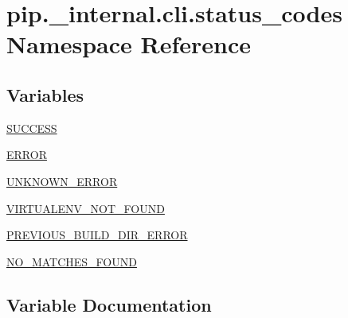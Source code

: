 \hypertarget{namespacepip_1_1__internal_1_1cli_1_1status__codes}{}\section{pip.\+\_\+internal.\+cli.\+status\+\_\+codes Namespace Reference}
\label{namespacepip_1_1__internal_1_1cli_1_1status__codes}
\subsection*{Variables}
\begin{DoxyCompactItemize}
\item 
\hyperlink{namespacepip_1_1__internal_1_1cli_1_1status__codes_a600893ce9f014138ba353274d9a6b47a}{S\+U\+C\+C\+E\+SS}
\item 
\hyperlink{namespacepip_1_1__internal_1_1cli_1_1status__codes_a2ebd7a21970dfe77aab693187bba32a4}{E\+R\+R\+OR}
\item 
\hyperlink{namespacepip_1_1__internal_1_1cli_1_1status__codes_a9f95e798d32dc470f7abd2d98fcde1d7}{U\+N\+K\+N\+O\+W\+N\+\_\+\+E\+R\+R\+OR}
\item 
\hyperlink{namespacepip_1_1__internal_1_1cli_1_1status__codes_afffef3dca49f6f3361ba824dddc30697}{V\+I\+R\+T\+U\+A\+L\+E\+N\+V\+\_\+\+N\+O\+T\+\_\+\+F\+O\+U\+ND}
\item 
\hyperlink{namespacepip_1_1__internal_1_1cli_1_1status__codes_a2b7acc0647c5854e146b34e32dfb7b3d}{P\+R\+E\+V\+I\+O\+U\+S\+\_\+\+B\+U\+I\+L\+D\+\_\+\+D\+I\+R\+\_\+\+E\+R\+R\+OR}
\item 
\hyperlink{namespacepip_1_1__internal_1_1cli_1_1status__codes_ac81706ccc579bd41934136d6973626d1}{N\+O\+\_\+\+M\+A\+T\+C\+H\+E\+S\+\_\+\+F\+O\+U\+ND}
\end{DoxyCompactItemize}


\subsection{Variable Documentation}
\mbox{\label{namespacepip_1_1__internal_1_1cli_1_1status__codes_a2ebd7a21970dfe77aab693187bba32a4}} 
